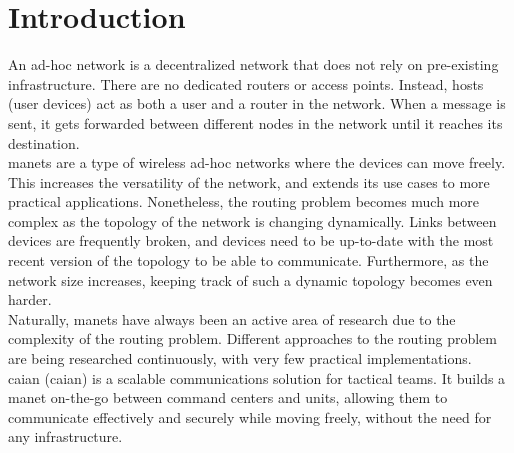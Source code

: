 \chapter{Introduction}


An ad-hoc network is a decentralized network that does not rely on pre-existing infrastructure. There are no dedicated routers or access points. Instead, hosts (user devices) act as both a user and a router in the network. When a message is sent, it gets forwarded between different nodes in the network until it reaches its destination.\cite{wu2004ad} \cite{ramanathan2002brief} \\

\acrfull{manets} are a type of wireless ad-hoc networks where the devices can move freely. This increases the versatility of the network, and extends its use cases to more practical applications. Nonetheless, the routing problem becomes much more complex as the topology of the network is changing dynamically. Links between devices are frequently broken, and devices need to be up-to-date with the most recent version of the topology to be able to communicate. Furthermore, as the network size increases, keeping track of such a dynamic topology becomes even harder.\cite{mohapatra2004ad} \\

Naturally, \acrshort{manets} have always been an active area of research due to the complexity of the routing problem. Different approaches to the routing problem are being researched continuously, with very few practical implementations. \\

\acrshort{caian} (\acrlong{caian}) is a scalable communications solution for tactical teams. It builds a \acrshort{manet} on-the-go between command centers and units, allowing them to communicate effectively and securely while moving freely, without the need for any infrastructure.

